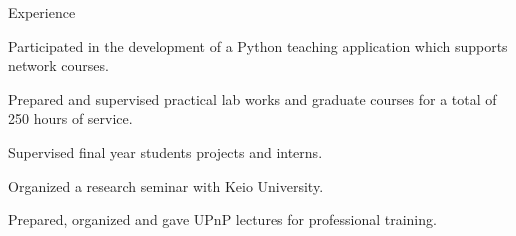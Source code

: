 \begin{cvhonors}
  \cventryshort
    {Experience}
    {\begin{cvitems}
        \item {Participated in the development of a Python teaching application which supports network courses.}
        \item {Prepared and supervised practical lab works and graduate courses for a total of 250 hours of service.}
        \item {Supervised final year students projects and interns.}
        \item {Organized a research seminar with Keio University.}
        \item {Prepared, organized and gave UPnP lectures for professional training.}
      \end{cvitems}
      }
\end{cvhonors}
